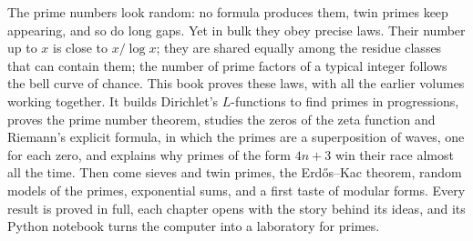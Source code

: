 The prime numbers look random: no formula produces them, twin primes keep appearing, and so do long gaps. Yet in bulk
they obey precise laws. Their number up to $x$ is close to $x/\log x$; they are shared equally among the residue classes
that can contain them; the number of prime factors of a typical integer follows the bell curve of chance. This book proves
these laws, with all the earlier volumes working together. It builds Dirichlet's $L$-functions to find primes in progressions, proves the prime number theorem, studies
the zeros of the zeta function and Riemann's explicit formula, in which the primes are a superposition of waves, one
for each zero, and explains why primes of the form $4n+3$ win their race almost all the time. Then come sieves and
twin primes, the Erd\H{o}s--Kac theorem, random models of the primes, exponential sums, and a first taste of modular
forms. Every result is proved in full, each chapter opens with the story behind its ideas, and its Python notebook
turns the computer into a laboratory for primes.
